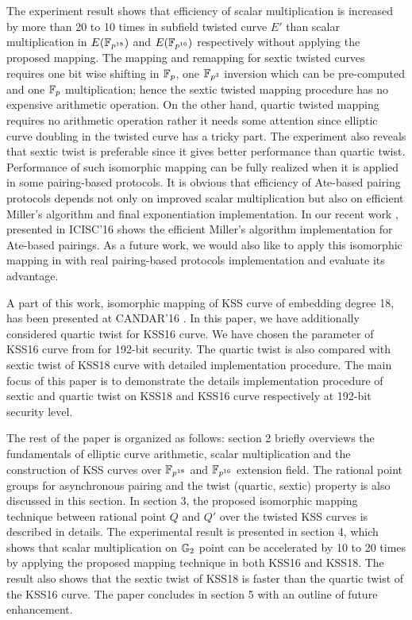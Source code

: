 The experiment result shows  that efficiency of  scalar multiplication is increased by more than 20 to 10 times in subfield  twisted curve $E'$ than scalar multiplication in $E(\mathbb{F}_{p^{18}})$ and $E(\mathbb{F}_{p^{16}})$ respectively without applying the proposed mapping. The mapping and remapping for sextic twisted curves requires one bit wise shifting in ${\mathbb{F}}_{p}$, one $\mathbb{F}_{p^3}$ inversion which can be pre-computed and one ${\mathbb{F}}_{p}$ multiplication; hence the sextic twisted mapping procedure has no expensive arithmetic operation. On the other hand, quartic twisted mapping requires no arithmetic operation rather it needs some attention since elliptic curve doubling in the twisted curve has a tricky part. The experiment also reveals that sextic twist is preferable since it gives better performance than quartic twist. 
Performance of such isomorphic mapping can be fully realized when it is applied in some pairing-based protocols. 
It is obvious that efficiency of Ate-based pairing protocols depends not only on improved scalar multiplication but also on efficient Miller's algorithm  and final exponentiation implementation. In our recent work \cite{ICISC:KONSD16}, presented in ICISC'16 shows the  efficient Miller's algorithm implementation for Ate-based pairings. 
As a future work, we would also like to apply this isomorphic mapping  in \cite{ICISC:KONSD16} with real pairing-based protocols implementation and evaluate its advantage. 

A part of this work, isomorphic mapping of KSS curve of embedding degree 18, has been presented at CANDAR'16 \cite{self_candar}.
In this paper, we have additionally considered quartic twist for  KSS16 curve. 
We have chosen the parameter of KSS16 curve from \cite{EPRINT:GhaFou16b} for 192-bit security.
The quartic twist is also compared with sextic twist of KSS18 curve with detailed implementation procedure. 
The main focus of this paper is to demonstrate the details implementation procedure of sextic and quartic twist on KSS18 and KSS16 curve respectively at 192-bit security level. 

The rest of the paper is organized as follows: section 2  briefly overviews the fundamentals of elliptic curve arithmetic, scalar multiplication and the construction of  KSS curves over $\mathbb{F}_{p^{18}}$ and $\mathbb{F}_{p^{16}}$ extension field. The rational point groups for asynchronous pairing and the twist (quartic, sextic) property is also discussed in this section.  
In section 3, the proposed isomorphic mapping technique between rational point $Q$ and $Q'$ over the twisted KSS curves is described in details. 
The experimental result is presented in section 4, which shows that scalar multiplication on ${\mathbb{G}}_{2}$ point can be accelerated by 10 to 20 times by applying the proposed mapping technique in both KSS16 and KSS18. The result also shows that the sextic twist of KSS18 is faster than the quartic twist of the KSS16 curve. 
The paper concludes in section 5  with an outline of future enhancement.

